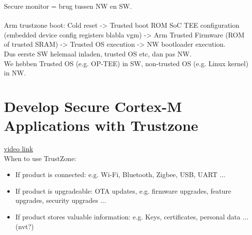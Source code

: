 Secure monitor = brug tussen NW en SW. \\
\\
Arm trustzone boot: Cold reset -> Trusted boot ROM SoC TEE configuration (embedded device config registers blabla vgm) -> Arm Trusted Firmware (ROM of trusted SRAM) -> Trusted OS execution -> NW bootloader execution.\\
Dus eerste SW helemaal inladen, trusted OS etc, dan pas NW.\\
We hebben Trusted OS (e.g. OP-TEE) in SW, non-trusted OS (e.g. Linux kernel) in NW.\\ 
\section{ Develop Secure Cortex-M Applications with Trustzone}
\hyperlink{https://www.youtube.com/watch?v=TkFC4Q2BwCM}{video link}
\\
When to use TrustZone: 
\begin{itemize}
    \item If product is connected: e.g. Wi-Fi, Bluetooth, Zigbee, USB, UART ... 
    \item If product is upgradeable: OTA updates, e.g. firmware upgrades, feature upgrades, security upgrades ...
    \item If product stores valuable information: e.g. Keys, certificates, personal data ... (nvt?)
\end{itemize}

